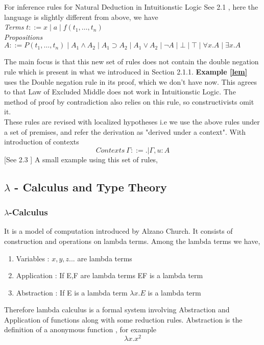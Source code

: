 \documentclass[12pt]{article}
\begin{document}
For inference rules for Natural Deduction in Intuitionstic Logic See 2.1 \cite{Pfenning2004}, here the language is slightly different from above, we have
\\
\textit{Terms} \quad $t ::= x \mid a \mid f(t_1, \ldots, t_n)$
\\
\textit{Propositions} \quad
$A ::= P(t_1, \ldots, t_n) \mid A_1 \land A_2 \mid A_1 \supset A_2 \mid A_1 \lor A_2 \mid \neg A \mid \bot \mid \top \mid \forall x. A \mid \exists x. A$

 The main focus is that this new set of rules does not contain the double negation rule which is present in what we introduced in Section 2.1.1. \textbf {Example \ref{lem}} uses the Double negation rule in its proof, which we don't have now. This agrees to that Law of Excluded Middle does not work in Intuitionstic Logic. The method of proof by contradiction also relies on this rule, so constructivists omit it.\\
These rules are revised with localized hypotheses i.e we use the above rules under a set of premises, and refer the derivation as "derived under a context". With introduction of contexts 
$$Contexts  \ \Gamma ::= .|\Gamma,u: A$$
[See 2.3 \cite{Pfenning2004}]
A small example using this set of rules,
$$ $$
\begin{example}
    
\end{example}

\subsection{$\lambda$ - Calculus and Type Theory} 

\subsubsection{ $\lambda$-Calculus}
It is a model of computation introduced by Alzano Church. It consists of construction and operations on lambda terms. 
Among the lambda terms we have,
\begin{enumerate}
    \item Variables : $x,y,z ...$ are lambda terms
    \item Application : If E,F are lambda terms EF is a lambda term 
    \item Abstraction : If E is a lambda term $\lambda x. E $ is a lambda term
\end{enumerate}
Therefore lambda calculus is a formal system involving Abstraction and Application of functions along with some reduction rules.
Abstraction is the definition of a anonymous function , for example \\
$$ \lambda x.x^2 $$
\end{document}
